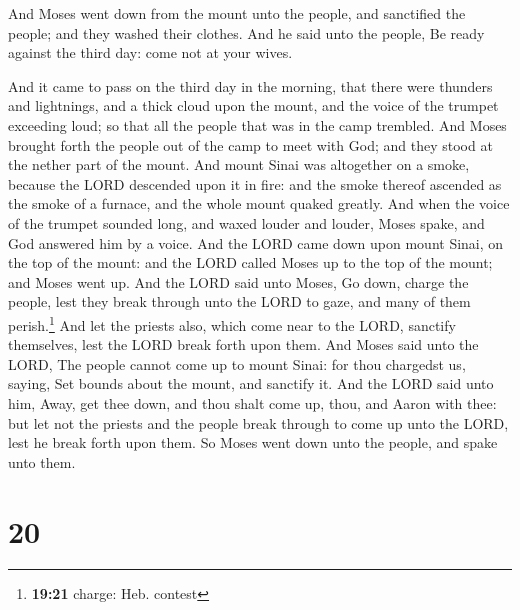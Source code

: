  And Moses went down from the mount unto the people, and
sanctified the people; and they washed their clothes. 
And he said unto the people, Be ready against the third day: come not at
your wives.

 And it came to pass on the third day in the morning,
that there were thunders and lightnings, and a thick cloud upon the
mount, and the voice of the trumpet exceeding loud; so that all the
people that was in the camp trembled.  And Moses brought
forth the people out of the camp to meet with God; and they stood at the
nether part of the mount.  And mount Sinai was altogether
on a smoke, because the LORD descended upon it in fire: and the smoke
thereof ascended as the smoke of a furnace, and the whole mount quaked
greatly.  And when the voice of the trumpet sounded long,
and waxed louder and louder, Moses spake, and God answered him by a
voice.  And the LORD came down upon mount Sinai, on the
top of the mount: and the LORD called Moses up to the top of the mount;
and Moses went up.  And the LORD said unto Moses, Go
down, charge the people, lest they break through unto the LORD to gaze,
and many of them perish.\footnote{\textbf{19:21} charge: Heb. contest}
 And let the priests also, which come near to the LORD,
sanctify themselves, lest the LORD break forth upon them.
 And Moses said unto the LORD, The people cannot come up
to mount Sinai: for thou chargedst us, saying, Set bounds about the
mount, and sanctify it.  And the LORD said unto him,
Away, get thee down, and thou shalt come up, thou, and Aaron with thee:
but let not the priests and the people break through to come up unto the
LORD, lest he break forth upon them.  So Moses went down
unto the people, and spake unto them.

\hypertarget{section-19}{%
\section{20}\label{section-19}}


